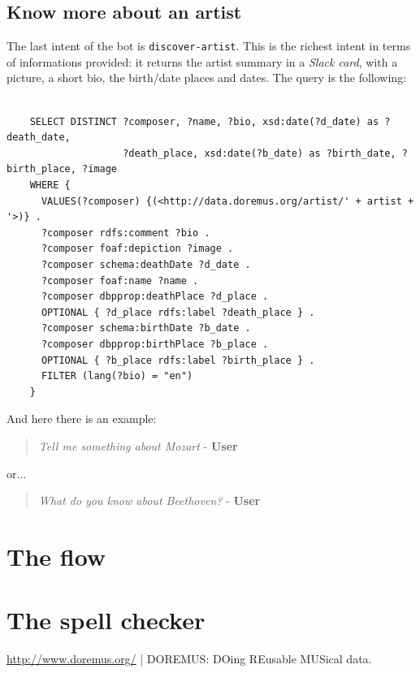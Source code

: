 \documentclass[a4paper,12pt]{report}
\begin{document}
	\subsection{Know more about an artist}
	The last intent of the bot is \texttt{discover-artist}. This is the richest intent in terms of informations provided: it returns the artist summary in a \textit{Slack card}, with a picture, a short bio, the birth/date places and dates.
	The query is the following:
	\begin{lstlisting}
	
	SELECT DISTINCT ?composer, ?name, ?bio, xsd:date(?d_date) as ?death_date,
	                ?death_place, xsd:date(?b_date) as ?birth_date, ?birth_place, ?image
	WHERE {
	  VALUES(?composer) {(<http://data.doremus.org/artist/' + artist + '>)} .
	  ?composer rdfs:comment ?bio .
	  ?composer foaf:depiction ?image .
	  ?composer schema:deathDate ?d_date .
	  ?composer foaf:name ?name .
	  ?composer dbpprop:deathPlace ?d_place .
	  OPTIONAL { ?d_place rdfs:label ?death_place } .
	  ?composer schema:birthDate ?b_date .
	  ?composer dbpprop:birthPlace ?b_place .
	  OPTIONAL { ?b_place rdfs:label ?birth_place } .
	  FILTER (lang(?bio) = "en")
	}
	\end{lstlisting}
	And here there is an example:
	\begin{verse}
		\textit{Tell me something about Mozart} - \textbf{User}\\
	\end{verse}
	or...
	\begin{verse}
		\textit{What do you know about Beethoven?} - \textbf{User}\\
	\end{verse}

	\section{The flow}
	\section{The spell checker}
	
	\begin{thebibliography}{9}
		 \href{http://www.doremus.org/}{http://www.doremus.org/} | DOREMUS: DOing REusable MUSical data.
	\end{thebibliography}
\end{document}
